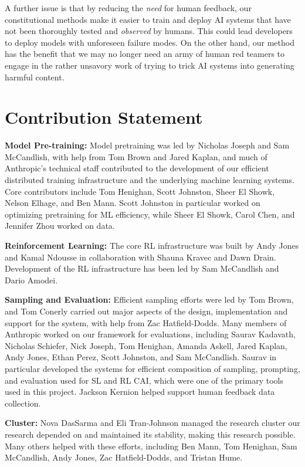 A further issue is that by reducing the \emph{need} for human feedback, our constitutional methods make it easier to train and deploy AI systems that have not been thoroughly tested and \emph{observed} by humans.   This could lead developers to deploy models with unforeseen failure modes. On the other hand, our method has the benefit that we may no longer need an army of human red teamers to engage in the rather unsavory work of trying to trick AI systems into generating harmful content.  

\section{Contribution Statement}
\label{sec:ContributionStatement}

{\bf Model Pre-training:} Model pretraining was led by  Nicholas Joseph and Sam McCandlish, with help from Tom Brown and Jared Kaplan, and much of Anthropic's technical staff contributed to the development of our efficient distributed training infrastructure and the underlying machine learning systems. Core contributors include Tom Henighan, Scott Johnston, Sheer El Showk, Nelson Elhage, and Ben Mann. Scott Johnston in particular worked on optimizing pretraining for ML efficiency, while Sheer El Showk, Carol Chen, and Jennifer Zhou worked on data.

{\bf Reinforcement Learning:} The core RL infrastructure was built by Andy Jones and Kamal Ndousse in collaboration with Shauna Kravec and Dawn Drain. Development of the RL infrastructure has been led by Sam McCandlish and Dario Amodei.

{\bf Sampling and Evaluation:} Efficient sampling efforts were led by Tom Brown, and Tom Conerly carried out major aspects of the design, implementation and support for the system, with help from Zac Hatfield-Dodds. Many members of Anthropic worked on our framework for evaluations, including Saurav Kadavath, Nicholas Schiefer, Nick Joseph, Tom Henighan, Amanda Askell, Jared Kaplan, Andy Jones, Ethan Perez, Scott Johnston, and Sam McCandlish. Saurav in particular developed the systems for efficient composition of sampling, prompting, and evaluation used for SL and RL CAI, which were one of the primary tools used in this project. Jackson Kernion helped support human feedback data collection.

{\bf Cluster:} Nova DasSarma and Eli Tran-Johnson managed the research cluster our research depended on and maintained its stability, making this research possible. Many others helped with these efforts, including Ben Mann, Tom Henighan, Sam McCandlish, Andy Jones, Zac Hatfield-Dodds, and Tristan Hume.

